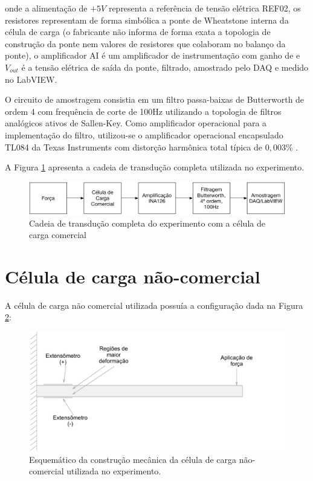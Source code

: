 \documentclass[a4paper]{instrumentacao}
\begin{document}
\noindent onde a alimentação de $+5V$ representa a referência de tensão elétrica REF02, os resistores representam de forma simbólica a ponte de Wheatstone interna da célula de carga (o fabricante não informa de forma exata a topologia de construção da ponte nem valores de resistores que colaboram no balanço da ponte), o amplificador AI é um amplificador de instrumentação com ganho de  e $V_{out}$ é a tensão elétrica de saída da ponte, filtrado, amostrado pelo DAQ e medido no LabVIEW.

O circuito de amostragem consistia em um filtro passa-baixas de Butterworth de ordem 4 com frequência de corte de 100Hz utilizando a topologia de filtros analógicos ativos de Sallen-Key. Como amplificador operacional para a implementação do filtro, utilizou-se o amplificador operacional encapsulado TL084 da Texas Instruments com distorção harmônica total típica de $0,003\%$ \cite{datasheet-tl084}.

A Figura \ref{fig:celula-comercial-cadeia-transducao} apresenta a cadeia de transdução completa utilizada no experimento.

\begin{figure}[H]
\center
\includegraphics[width=\textwidth]{Comercial-Cadeia-Transducao.pdf}
\caption{Cadeia de transdução completa do experimento com a célula de carga comercial}
\label{fig:celula-comercial-cadeia-transducao}
\end{figure}


\section{Célula de carga não-comercial}

A célula de carga não comercial utilizada possuía a configuração dada na Figura \ref{fig:celula-nao-comercial-desenho}:

\begin{figure}[H]
\center
\includegraphics[width=\textwidth]{CelulaNaoComercial.pdf}
\caption{Esquemático da construção mecânica da célula de carga não-comercial utilizada no experimento.}
\label{fig:celula-nao-comercial-desenho}
\end{figure}
\end{document}
